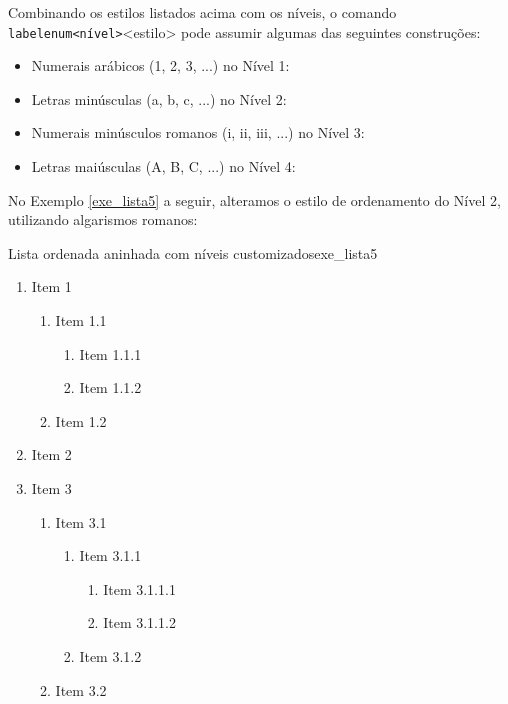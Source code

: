 Combinando os estilos listados acima com os níveis, o comando \texttt{labelenum<nível>}{<estilo>} pode assumir algumas das seguintes construções:

\begin{itemize}
    \item Numerais arábicos (1, 2, 3, ...) no Nível 1:\\
    \texttt{\renewcommand{\labelenumi}{\arabic{enumi}}}
    \item Letras minúsculas (a, b, c, ...) no Nível 2:\\ \texttt{\renewcommand{\labelenumii}{\alph{enumii}}}
    \item Numerais minúsculos romanos (i, ii, iii, ...) no Nível 3:\\ \texttt{\renewcommand{\labelenumiii}{\roman{enumiii}}}
    \item Letras maiúsculas (A, B, C, ...) no Nível 4:\\ \texttt{\renewcommand{\labelenumiv}{\Alph{enumiv}}}
\end{itemize}

No Exemplo \ref{exe_lista5} a seguir, alteramos o estilo de ordenamento do Nível 2, utilizando algarismos romanos:

\begin{texexptitled}[breakable,enhanced,middle=2mm]{Lista ordenada aninhada com níveis customizados}{exe_lista5}
\renewcommand{\labelenumi}{\arabic{enumi}}
\renewcommand{\labelenumii}{\alph{enumii}}
\renewcommand{\labelenumiii}{\roman{enumiii}}
\renewcommand{\labelenumiv}{\Alph{enumiv}}
\begin{enumerate}
    \item Item 1
    \begin{enumerate}
        \item Item 1.1
        \begin{enumerate}
            \item Item 1.1.1
            \item Item 1.1.2
        \end{enumerate}
        \item Item 1.2
    \end{enumerate}
    \item Item 2
    \item Item 3
    \begin{enumerate}
        \item Item 3.1
         \begin{enumerate}
            \item Item 3.1.1
            \begin{enumerate}
                \item Item 3.1.1.1
                \item Item 3.1.1.2
            \end{enumerate}
            \item Item 3.1.2
        \end{enumerate}
        \item Item 3.2
    \end{enumerate}
\end{enumerate}
\end{texexptitled}


